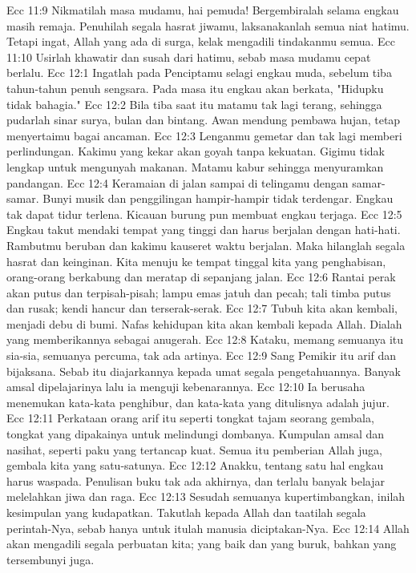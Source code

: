 Ecc 11:9  Nikmatilah masa mudamu, hai pemuda! Bergembiralah selama engkau masih remaja. Penuhilah segala hasrat jiwamu, laksanakanlah semua niat hatimu. Tetapi ingat, Allah yang ada di surga, kelak mengadili tindakanmu semua.
Ecc 11:10  Usirlah khawatir dan susah dari hatimu, sebab masa mudamu cepat berlalu.
Ecc 12:1  Ingatlah pada Penciptamu selagi engkau muda, sebelum tiba tahun-tahun penuh sengsara. Pada masa itu engkau akan berkata, "Hidupku tidak bahagia."
Ecc 12:2  Bila tiba saat itu matamu tak lagi terang, sehingga pudarlah sinar surya, bulan dan bintang. Awan mendung pembawa hujan, tetap menyertaimu bagai ancaman.
Ecc 12:3  Lenganmu gemetar dan tak lagi memberi perlindungan. Kakimu yang kekar akan goyah tanpa kekuatan. Gigimu tidak lengkap untuk mengunyah makanan. Matamu kabur sehingga menyuramkan pandangan.
Ecc 12:4  Keramaian di jalan sampai di telingamu dengan samar-samar. Bunyi musik dan penggilingan hampir-hampir tidak terdengar. Engkau tak dapat tidur terlena. Kicauan burung pun membuat engkau terjaga.
Ecc 12:5  Engkau takut mendaki tempat yang tinggi dan harus berjalan dengan hati-hati. Rambutmu beruban dan kakimu kauseret waktu berjalan. Maka hilanglah segala hasrat dan keinginan. Kita menuju ke tempat tinggal kita yang penghabisan, orang-orang berkabung dan meratap di sepanjang jalan.
Ecc 12:6  Rantai perak akan putus dan terpisah-pisah; lampu emas jatuh dan pecah; tali timba putus dan rusak; kendi hancur dan terserak-serak.
Ecc 12:7  Tubuh kita akan kembali, menjadi debu di bumi. Nafas kehidupan kita akan kembali kepada Allah. Dialah yang memberikannya sebagai anugerah.
Ecc 12:8  Kataku, memang semuanya itu sia-sia, semuanya percuma, tak ada artinya.
Ecc 12:9  Sang Pemikir itu arif dan bijaksana. Sebab itu diajarkannya kepada umat segala pengetahuannya. Banyak amsal dipelajarinya lalu ia menguji kebenarannya.
Ecc 12:10  Ia berusaha menemukan kata-kata penghibur, dan kata-kata yang ditulisnya adalah jujur.
Ecc 12:11  Perkataan orang arif itu seperti tongkat tajam seorang gembala, tongkat yang dipakainya untuk melindungi dombanya. Kumpulan amsal dan nasihat, seperti paku yang tertancap kuat. Semua itu pemberian Allah juga, gembala kita yang satu-satunya.
Ecc 12:12  Anakku, tentang satu hal engkau harus waspada. Penulisan buku tak ada akhirnya, dan terlalu banyak belajar melelahkan jiwa dan raga.
Ecc 12:13  Sesudah semuanya kupertimbangkan, inilah kesimpulan yang kudapatkan. Takutlah kepada Allah dan taatilah segala perintah-Nya, sebab hanya untuk itulah manusia diciptakan-Nya.
Ecc 12:14  Allah akan mengadili segala perbuatan kita; yang baik dan yang buruk, bahkan yang tersembunyi juga.


